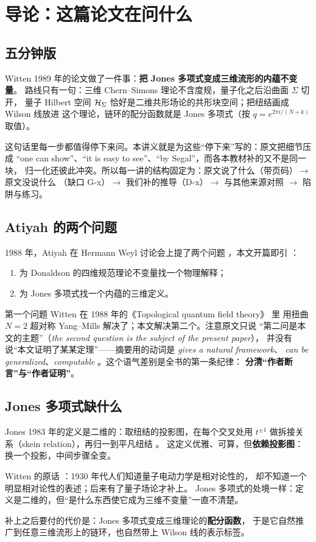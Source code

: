 \section{导论：这篇论文在问什么}\label{sec:intro}

\subsection{五分钟版}
Witten 1989 年的论文做了一件事：\textbf{把 Jones 多项式变成三维流形的内蕴不变量}。
路线只有一句：三维 Chern--Simons 理论不含度规，量子化之后沿曲面 $\Sigma$ 切开，
量子 Hilbert 空间 $\mathcal{H}_\Sigma$ 恰好是二维共形场论的共形块空间；把纽结画成 Wilson 线放进
这个理论，链环的配分函数就是 Jones 多项式（按 $q=e^{2\pi i/(N+k)}$ 取值）。

这句话里每一步都值得停下来问。本讲义就是为这些“停下来”写的：原文把细节压成
“one can show”、“it is easy to see”、“by Segal”，而各本教材补的又不是同一块，
归一化还彼此冲突。所以每一讲的结构固定为：原文说了什么（带页码）$\to$ 原文没说什么
（缺口 G-x）$\to$ 我们补的推导（D-x）$\to$ 与其他来源对照 $\to$ 陷阱与练习。

\subsection{Atiyah 的两个问题}
1988 年，Atiyah 在 Hermann Weyl 讨论会上提了两个问题 ，本文开篇即引 \cite{atiyah1988}：
\begin{enumerate}
  \item 为 Donaldson 的四维规范理论不变量找一个物理解释；
  \item 为 Jones 多项式找一个内蕴的三维定义。
\end{enumerate}
第一个问题 Witten 在 1988 年的《Topological quantum field theory》\cite{witten1988tqft} 里
用扭曲 $N=2$ 超对称 Yang--Mills 解决了；本文解决第二个。注意原文只说
“第二问是本文的主题”（\emph{the second question is the subject of the present paper}），
并没有说“本文证明了某某定理”——摘要用的动词是 \emph{gives a natural framework}、
\emph{can be generalized}、\emph{computable} 。这个语气差别是全书的第一条纪律：
\textbf{分清“作者断言”与“作者证明”}。

\subsection{Jones 多项式缺什么}
Jones 1983 年的定义是二维的：取纽结的投影图，在每个交叉处用
$t^{\pm1}$ 做拆接关系（skein relation），再归一到平凡纽结 \cite{jones1985}。
这定义优雅、可算，但\textbf{依赖投影图}：换一个投影，中间步骤全变。
\begin{keypoint}[原文的类比]
Witten 的原话 ：1930 年代人们知道量子电动力学是相对论性的，
却不知道一个明显相对论性的表述；后来有了量子场论才补上。
Jones 多项式的处境一样：定义是二维的，但“是什么东西使它成为三维不变量”一直不清楚。
\end{keypoint}
补上之后要付的代价是：Jones 多项式变成三维理论的\textbf{配分函数}，
于是它自然推广到任意三维流形上的链环，也自然带上 Wilson 线的表示标签。

